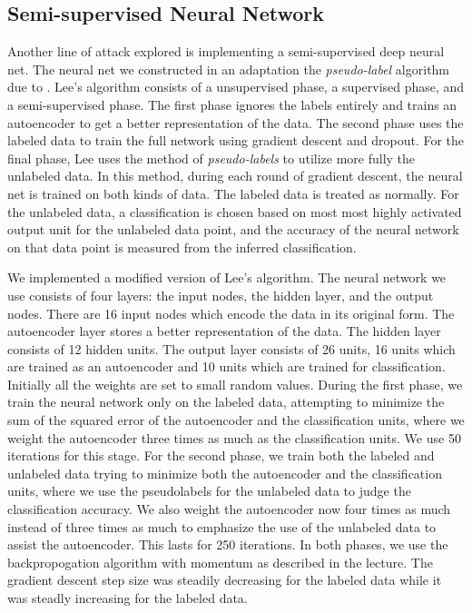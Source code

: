 \documentclass[11pt]{article}
\begin{document}
\subsection{Semi-supervised Neural Network}

Another line of attack explored is implementing a semi-supervised deep neural net. The neural net we constructed in an adaptation the \emph{pseudo-label} algorithm due to \cite{Lee:2013}. Lee's algorithm consists of a unsupervised phase, a supervised phase, and a semi-supervised phase. The first phase ignores the labels entirely and trains an autoencoder to get a better representation of the data. The second phase uses the labeled data to train the full network using gradient descent and dropout. For the final phase, Lee uses the method of \emph{pseudo-labels} to utilize more fully the unlabeled data. In this method, during each round of gradient descent, the neural net is trained on both kinds of data. The labeled data is treated as normally. For the unlabeled data, a classification is chosen based on most most highly activated output unit for the unlabeled data point, and the accuracy of the neural network on that data point is measured from the inferred classification.

We implemented a modified version of Lee's algorithm. The neural network we use consists of four layers: the input nodes, the hidden layer, and the output nodes. There are 16 input nodes which encode the data in its original form. The autoencoder layer stores a better representation of the data. The hidden layer consists of 12 hidden units. The output layer consists of 26 units, 16 units which are trained as an autoencoder and 10 units which are trained for classification. Initially all the weights are set to small random values. During the first phase, we train the neural network only on the labeled data, attempting to minimize the sum of the squared error of the autoencoder and the classification units, where we weight the autoencoder three times as much as the classification units. We use 50 iterations for this stage. For the second phase, we train both the labeled and unlabeled data trying to minimize both the autoencoder and the classification units, where we use the pseudolabels for the unlabeled data to judge the classification accuracy. We also weight the autoencoder now four times as much instead of three times as much to emphasize the use of the unlabeled data to assist the autoencoder. This lasts for 250 iterations. In both phases, we use the backpropogation algorithm with momentum as described in the lecture. The gradient descent step size was steadily decreasing for the labeled data while it was steadly increasing for the labeled data.
\end{document}
